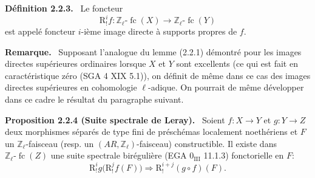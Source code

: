 \documentclass[11pt]{article}
\newenvironment{statement}[1]{\par\medskip\noindent\textbf{#1.}\ }{\par\medskip}
\newcommand{\R}{\mathrm{R}}\newcommand{\RHomCore}{\mathrm{RHom}}
\providecommand{\fc}{\operatorname{fc}}
\providecommand{\R}{\mathrm R}
\begin{document}
\begin{statement}{Définition 2.2.3}
Le foncteur
\[
\R^i_!f:\mathbb Z_\ell\text{-}\fc(X)\longrightarrow \mathbb Z_\ell\text{-}\fc(Y)
\]
est appelé foncteur \(i\)-ième image directe à supports propres de \(f\).
\end{statement}

\begin{statement}{Remarque}
Supposant l'analogue du lemme (2.2.1) démontré pour les images directes supérieures ordinaires lorsque \(X\) et \(Y\) sont excellents (ce qui est fait en caractéristique zéro (SGA 4 XIX 5.1)), on définit de même dans ce cas des images directes supérieures en cohomologie \(\ell\)-adique. On pourrait de même développer dans ce cadre le résultat du paragraphe suivant.
\end{statement}

\begin{statement}{Proposition 2.2.4 (Suite spectrale de Leray)}
Soient \(f:X\to Y\) et \(g:Y\to Z\) deux morphismes séparés de type fini de préschémas localement noethériens et \(F\) un \(\mathbb Z_\ell\)-faisceau (resp. un \((AR,\mathbb Z_\ell)\)-faisceau) constructible. Il existe dans \(\mathbb Z_\ell\text{-}\fc(Z)\) une suite spectrale birégulière (EGA \(0_{\mathrm{III}}\) 11.1.3) fonctorielle en \(F\):
\[
\R^i_!g\bigl(\R^j_!f(F)\bigr)\Longrightarrow \R^{i+j}_!(g\circ f)(F).
\]
\end{statement}
\end{document}
